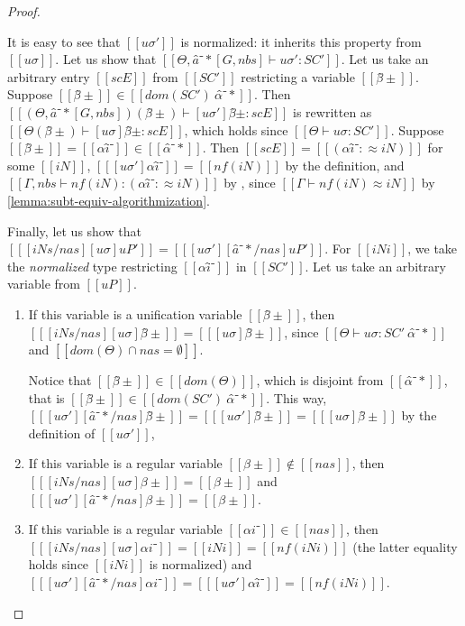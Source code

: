 \begin{proof}
\begin{caseof}
        It is easy to see that $[[uσ']]$ is normalized: it inherits this property from 
        $[[uσ]]$.
        Let us show that $[[Θ, â⁻*[G, nbs] ⊢ uσ' : SC']] $.
        Let us take an arbitrary entry $[[scE]]$ from $[[SC']]$ restricting a variable $[[β̂±]]$.
        Suppose $[[β̂±]] \in [[dom(SC') \ {α̂⁻*}]]$. Then
        $[[ (Θ, â⁻*[G, nbs])(β̂±) ⊢ [uσ']β̂± : scE ]]$ is
        rewritten as $[[ Θ(β̂±) ⊢ [uσ]β̂± : scE ]]$, which holds since $[[ Θ   ⊢ uσ : SC' ]]$.
        Suppose $[[β̂±]] = [[αî⁻]] \in [[α̂⁻*]]$. Then
        $[[scE]] = [[(αî⁻ :≈ iN)]]$ for some $[[iN]]$, 
        $[[ [uσ']αî⁻ ]] = [[ nf(iN) ]]$ by the definition,
        and $[[ Γ, nbs ⊢ nf(iN) : (αî⁻ :≈ iN) ]]$ by ,
        since $[[Γ ⊢ nf(iN) ≈ iN]]$ by \cref{lemma:subt-equiv-algorithmization}.

        Finally, let us show that $[[ [iNs/nas][uσ]uP' ]] = [[ [uσ'][â⁻*/nas]uP' ]]$.
        For $[[iNi]]$, we take the \emph{normalized} type restricting $[[αî⁻]]$ in $[[SC']]$.
        Let us take an arbitrary variable from $[[uP]]$.
        \begin{enumerate}
            \item If this variable is a unification variable $[[β̂±]]$, then
                $[[ [iNs/nas][uσ] β̂± ]] = [[ [uσ]β̂± ]] $, since $[[ Θ   ⊢ uσ : SC' \ {α̂⁻*} ]]$ and 
                $[[ dom(Θ) ∩ {nas} = ∅ ]]$. 

                Notice that $[[β̂±]] \in [[dom(Θ)]]$, which is disjoint from $[[{α̂⁻*}]]$, 
                that is $[[β̂±]] \in [[dom(SC') \ {α̂⁻*}]]$. This way,
                $[[ [uσ'][â⁻*/nas]β̂± ]] = [[  [uσ']β̂± ]] = [[ [uσ]β̂± ]]$ by the definition 
                of $[[uσ']]$,
            \item If this variable is a regular variable $[[β±]] \notin [[nas]]$, then 
                $[[ [iNs/nas][uσ] β± ]] = [[ β± ]] $ and\\ $[[ [uσ'][â⁻*/nas]β± ]] = [[ β± ]]$. 
            \item If this variable is a regular variable $[[αi⁻]] \in [[nas]]$, then 
                $[[ [iNs/nas][uσ] αi⁻ ]] = [[ iNi ]] = [[ nf(iNi) ]]$
                (the latter equality holds since $[[iNi]]$ is normalized)
                and $[[ [uσ'][â⁻*/nas]αi⁻ ]] = [[  [uσ']αî⁻ ]] = [[ nf(iNi) ]]$.
        \end{enumerate}
    \end{caseof}
\end{proof}

